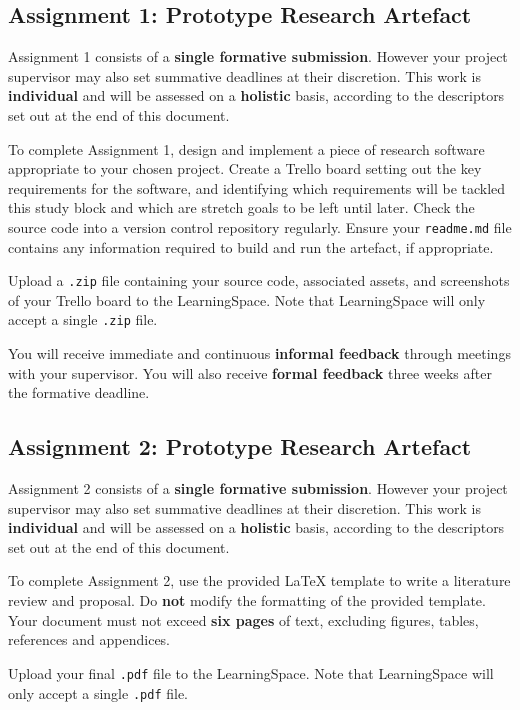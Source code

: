 \documentclass{../fal_assignment}
\begin{document}
\subsection*{Assignment 1: Prototype Research Artefact}

Assignment 1 consists of a \textbf{single formative submission}.
However your project supervisor may also set summative deadlines at their discretion.
This work is \textbf{individual} and will be assessed on a \textbf{holistic} basis,
according to the descriptors set out at the end of this document.

To complete Assignment 1, design and implement a piece of research software appropriate to your chosen project.
Create a Trello board setting out the key requirements for the software,
and identifying which requirements will be tackled this study block
and which are stretch goals to be left until later.
Check the source code into a version control repository regularly.
Ensure your \texttt{readme.md} file contains any information required to build and run the artefact, if appropriate.

Upload a \texttt{.zip} file containing your source code, associated assets, and screenshots of your Trello board to the LearningSpace.
Note that LearningSpace will only accept a single \texttt{.zip} file.

You will receive immediate and continuous \textbf{informal feedback} through meetings with your supervisor.
You will also receive \textbf{formal feedback} three weeks after the formative deadline.

\subsection*{Assignment 2: Prototype Research Artefact}

Assignment 2 consists of a \textbf{single formative submission}.
However your project supervisor may also set summative deadlines at their discretion.
This work is \textbf{individual} and will be assessed on a \textbf{holistic} basis,
according to the descriptors set out at the end of this document.

To complete Assignment 2, use the provided LaTeX template to write a literature review and proposal.
Do \textbf{not} modify the formatting of the provided template.
Your document must not exceed \textbf{six pages} of text,
excluding figures, tables, references and appendices.

Upload your final \texttt{.pdf} file to the LearningSpace.
Note that LearningSpace will only accept a single \texttt{.pdf} file.
\end{document}
